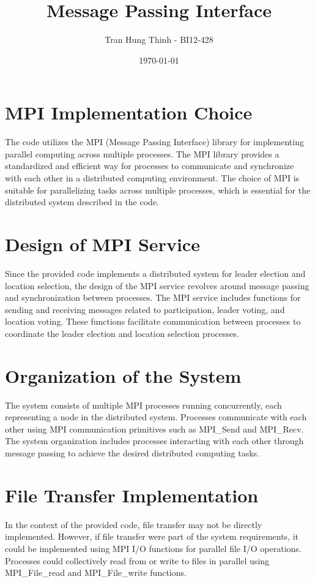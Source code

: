 \documentclass{article}
\begin{document}
\title{Message Passing Interface}
\author{Tran Hung Thinh - BI12-428}
\date{\today}

\maketitle
\section{MPI Implementation Choice}
The code utilizes the MPI (Message Passing Interface) library for implementing parallel computing across multiple processes. The MPI library provides a standardized and efficient way for processes to communicate and synchronize with each other in a distributed computing environment. The choice of MPI is suitable for parallelizing tasks across multiple processes, which is essential for the distributed system described in the code.

\section{Design of MPI Service}
Since the provided code implements a distributed system for leader election and location selection, the design of the MPI service revolves around message passing and synchronization between processes. The MPI service includes functions for sending and receiving messages related to participation, leader voting, and location voting. These functions facilitate communication between processes to coordinate the leader election and location selection processes.

\section{Organization of the System}
The system consists of multiple MPI processes running concurrently, each representing a node in the distributed system. Processes communicate with each other using MPI communication primitives such as MPI\_Send and MPI\_Recv. The system organization includes processes interacting with each other through message passing to achieve the desired distributed computing tasks.

\section{File Transfer Implementation}
In the context of the provided code, file transfer may not be directly implemented. However, if file transfer were part of the system requirements, it could be implemented using MPI I/O functions for parallel file I/O operations. Processes could collectively read from or write to files in parallel using MPI\_File\_read and MPI\_File\_write functions.
\end{document}
